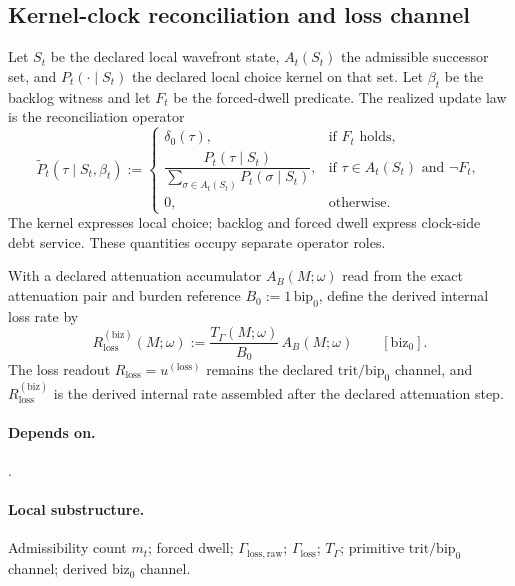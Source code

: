 \subsection{Kernel-clock reconciliation and loss channel}\label{subsec:kernel-clock-rest}
\begin{definition}
\label{def:kernel-clock-reconciliation}
Let $S_t$ be the declared local wavefront state, $A_t(S_t)$ the admissible successor set, and $P_t(\cdot\mid S_t)$ the declared local choice kernel on that set. Let $\beta_t$ be the backlog witness and let $F_t$ be the forced-dwell predicate. The realized update law is the reconciliation operator
\[
\widetilde P_t(\tau\mid S_t,\beta_t):=
\begin{cases}
\delta_0(\tau), & \text{if }F_t\text{ holds},\\[4pt]
\dfrac{P_t(\tau\mid S_t)}{\sum_{\sigma\in A_t(S_t)}P_t(\sigma\mid S_t)}, & \text{if }\tau\in A_t(S_t)\text{ and }\neg F_t,\\[8pt]
0, & \text{otherwise.}
\end{cases}
\]
The kernel expresses local choice; backlog and forced dwell express clock-side debt service. These quantities occupy separate operator roles.
\end{definition}

\begin{definition}
\label{def:rest-biz}
With a declared attenuation accumulator $A_B(M;\omega)$ read from the exact attenuation pair and burden reference $B_0:=1\,\mathrm{bip}_0$, define the derived internal loss rate by
\[
R_{\mathrm{loss}}^{(\mathrm{biz})}(M;\omega):=\frac{T_\Gamma(M;\omega)}{B_0}\,A_B(M;\omega)
\qquad [\mathrm{biz}_0].
\]
The loss readout $R_{\mathrm{loss}}=u^{(\mathrm{loss})}$ remains the declared \(\mathrm{trit}/\mathrm{bip}_0\) channel, and $R_{\mathrm{loss}}^{(\mathrm{biz})}$ is the derived internal rate assembled after the declared attenuation step.
\end{definition}

\paragraph{Depends on.} .
\paragraph{Local substructure.} Admissibility count $m_t$; forced dwell; $\Gamma_{\mathrm{loss,raw}}$; $\Gamma_{\mathrm{loss}}$; $T_\Gamma$; primitive \(\mathrm{trit}/\mathrm{bip}_0\) channel; derived \(\mathrm{biz}_0\) channel.
